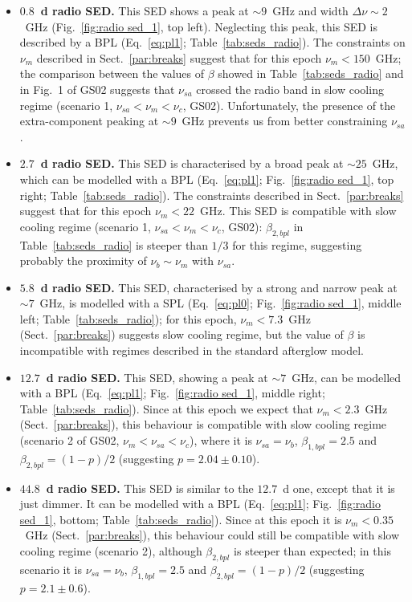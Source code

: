 \documentclass{aa}
\begin{document}
\begin{itemize}
\item \textbf{$0.8$~d radio SED.} This SED shows a peak at $\sim 9$~GHz and width $\Delta\nu\sim 2$~GHz (Fig.~\ref{fig:radio sed_1}, top left).
Neglecting this peak, this SED is described by a BPL (Eq.~\ref{eq:pl1}; Table~\ref{tab:seds_radio}).
The constraints on $\nu_m$ described in Sect.~\ref{par:breaks} suggest that for this epoch $\nu_m < 150$~GHz; the comparison between the values of $\beta$ showed in Table~\ref{tab:seds_radio} and in Fig.~1 of GS02 suggests that $\nu_{sa}$ crossed the radio band in slow cooling regime (scenario 1, $\nu_{sa} < \nu_m < \nu_c$, GS02).
Unfortunately, the presence of the extra-component peaking at $\sim 9$~GHz prevents us from better constraining $\nu_{sa}$.
%
\item \textbf{$2.7$~d radio SED.} This SED is characterised by a broad peak at $\sim 25$~GHz, which can be modelled with a BPL (Eq.~\ref{eq:pl1}; Fig.~\ref{fig:radio sed_1}, top right; Table~\ref{tab:seds_radio}).
The constraints described in Sect.~\ref{par:breaks} suggest that for this epoch $\nu_m < 22$~GHz.
This SED is compatible with slow cooling regime (scenario 1, $\nu_{sa} < \nu_m < \nu_c$, GS02): $\beta_{2,bpl}$ in Table~\ref{tab:seds_radio} is steeper than $1/3$ for this regime, suggesting probably the proximity of $\nu_b \sim \nu_m$ with $\nu_{sa}$.
%
\item \textbf{$5.8$~d radio SED.} This SED, characterised by a strong and narrow peak at $\sim 7$~GHz, is modelled with a SPL (Eq.~\ref{eq:pl0}; Fig.~\ref{fig:radio sed_1}, middle left; Table~\ref{tab:seds_radio}); for this epoch, $\nu_m < 7.3$~GHz (Sect.~\ref{par:breaks}) suggests slow cooling regime, but the value of $\beta$ is incompatible with regimes described in the standard afterglow model.
%
\item \textbf{$12.7$~d radio SED.} This SED, showing a peak at $\sim 7$~GHz, can be modelled with a BPL (Eq.~\ref{eq:pl1}; Fig.~\ref{fig:radio sed_1}, middle right; Table~\ref{tab:seds_radio}).
Since at this epoch we expect that $\nu_m < 2.3$~GHz (Sect.~\ref{par:breaks}), this behaviour is compatible with slow cooling regime (scenario 2 of GS02, $\nu_m < \nu_{sa} < \nu_c$), where it is $\nu_{sa} = \nu_b$, $\beta_{1,bpl} = 2.5$ and $\beta_{2,bpl} = (1-p)/2$ (suggesting $p = 2.04 \pm 0.10$).
%
\item \textbf{$44.8$~d radio SED.} This SED is similar to the $12.7$~d one, except that it is just dimmer.
It can be modelled with a BPL (Eq.~\ref{eq:pl1}; Fig.~\ref{fig:radio sed_1}, bottom; Table~\ref{tab:seds_radio}).
Since at this epoch it is $\nu_m < 0.35$~GHz (Sect.~\ref{par:breaks}), this behaviour could still be compatible with slow cooling regime (scenario 2), although $\beta_{2,bpl}$ is steeper than expected; in this scenario it is $\nu_{sa} = \nu_b$, $\beta_{1,bpl} = 2.5$ and $\beta_{2,bpl} = (1-p)/2$ (suggesting $p = 2.1 \pm 0.6$).
\end{itemize}
\end{document}
